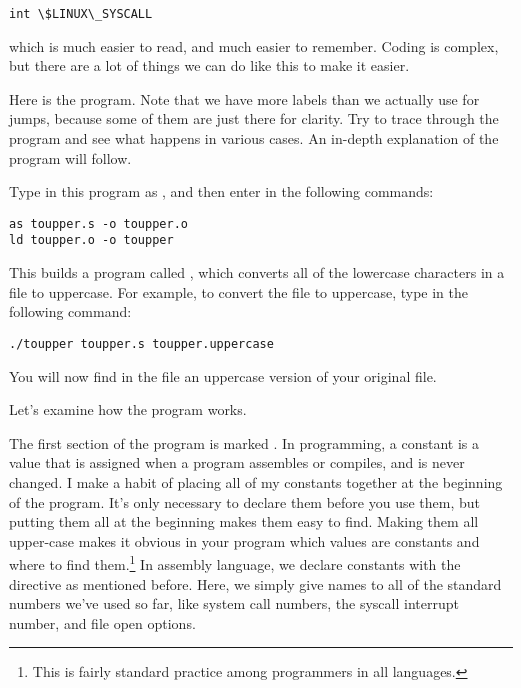 \begin{simpletyping}
\begin{lstlisting}
int \$LINUX\_SYSCALL
\end{lstlisting}
\end{simpletyping}

which is much easier to read, and
much easier to remember.  Coding is complex, but there are a lot of things
we can do like this to make it easier.

Here is the program.  Note that we have more labels
 than we actually use for jumps,
because some of them are just there for clarity.  Try to trace
through the program and see what happens in various cases.  An in-depth
explanation of the program will follow.

\begin{simpletyping}

\end{simpletyping}

Type in this program as , and then enter in 
the following commands:  

\begin{simpletyping}
\begin{lstlisting}
as toupper.s -o toupper.o
ld toupper.o -o toupper
\end{lstlisting}
\end{simpletyping}

This builds a program called , which converts
all of the lowercase characters in a file to uppercase.
For example, to convert the file  to 
uppercase, type in the following command:

\begin{simpletyping}
\begin{lstlisting}
./toupper toupper.s toupper.uppercase
\end{lstlisting}
\end{simpletyping}

You will now find in the file  an 
uppercase version of your original file.

Let's examine how the program works.

The first section of the program is marked .  In
programming, a constant is a value that is assigned when a program assembles or
compiles, and is never changed.  I make a habit of placing all of my constants
together at the beginning of the program.  It's only necessary to declare them
before you use them, but putting them all at the beginning makes them easy to 
find.  Making them all upper-case makes it obvious in your program which 
values are constants and where to find them.\footnote{This is fairly
standard practice among programmers in all languages.}
In assembly language, we 
declare constants with
the  directive as mentioned before.  Here, we simply
give names to all of the standard numbers we've used so far, like system call
numbers, the syscall interrupt number, and file open options.

